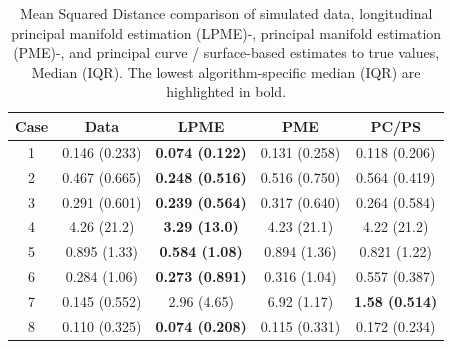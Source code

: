 \documentclass[11pt,reqno]{article}
\theoremstyle{definition}
\begin{document}
\begin{table}[h]
  \centering
  \begin{tabular}{|c c c c c|}
    \hline
    Case & Data & LPME & PME & PC/PS \\
    \hline
    1 & 0.146 (0.233) & {\bf 0.074 (0.122)} & 0.131 (0.258) & 0.118 (0.206) \\
    2 & 0.467 (0.665) & {\bf 0.248 (0.516)} & 0.516 (0.750) & 0.564 (0.419) \\
    3 & 0.291 (0.601) & {\bf 0.239 (0.564)} & 0.317 (0.640) & 0.264 (0.584) \\
    4 & 4.26 (21.2) & {\bf 3.29 (13.0)} & 4.23 (21.1) & 4.22 (21.2) \\
    5 & 0.895 (1.33) & {\bf 0.584 (1.08)} & 0.894 (1.36) & 0.821 (1.22) \\
    6 & 0.284 (1.06) & {\bf 0.273 (0.891)} & 0.316 (1.04) & 0.557 (0.387) \\
    7 & 0.145 (0.552) & 2.96 (4.65) & 6.92 (1.17) & {\bf 1.58 (0.514)} \\
    8 & 0.110 (0.325) & {\bf 0.074 (0.208)} & 0.115 (0.331) & 0.172 (0.234) \\
    \hline
  \end{tabular}
  \caption{Mean Squared Distance comparison of simulated data, longitudinal principal manifold estimation (LPME)-, principal manifold estimation (PME)-, and principal curve / surface-based estimates to true values, Median (IQR). The lowest algorithm-specific median (IQR) are highlighted in bold.}
  \label{table:simulation_results_median}
\end{table}
\end{document}

